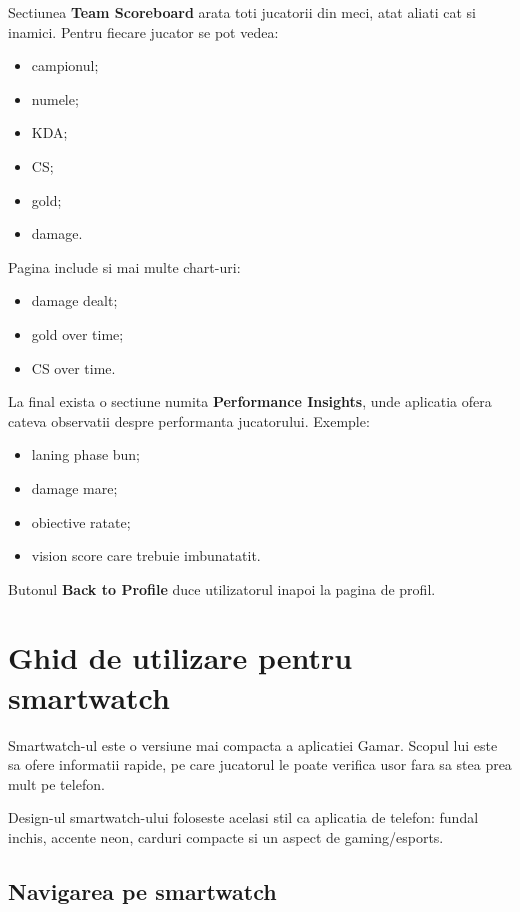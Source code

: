 \documentclass[12pt,a4paper]{article}
\begin{document}
Sectiunea \textbf{Team Scoreboard} arata toti jucatorii din meci, atat aliati cat si inamici. Pentru fiecare jucator se pot vedea:

\begin{itemize}
    \item campionul;
    \item numele;
    \item KDA;
    \item CS;
    \item gold;
    \item damage.
\end{itemize}

Pagina include si mai multe chart-uri:

\begin{itemize}
    \item damage dealt;
    \item gold over time;
    \item CS over time.
\end{itemize}

La final exista o sectiune numita \textbf{Performance Insights}, unde aplicatia ofera cateva observatii despre performanta jucatorului. Exemple:

\begin{itemize}
    \item laning phase bun;
    \item damage mare;
    \item obiective ratate;
    \item vision score care trebuie imbunatatit.
\end{itemize}

Butonul \textbf{Back to Profile} duce utilizatorul inapoi la pagina de profil.

\section{Ghid de utilizare pentru smartwatch}

Smartwatch-ul este o versiune mai compacta a aplicatiei Gamar. Scopul lui este sa ofere informatii rapide, pe care jucatorul le poate verifica usor fara sa stea prea mult pe telefon.

Design-ul smartwatch-ului foloseste acelasi stil ca aplicatia de telefon: fundal inchis, accente neon, carduri compacte si un aspect de gaming/esports.

\subsection{Navigarea pe smartwatch}
\end{document}
